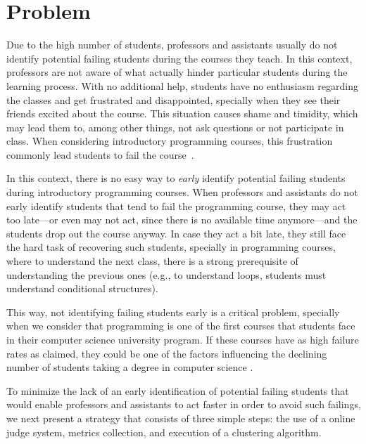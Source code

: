 \section{Problem}

\label{sec:problem}

Due to the high number of students, professors and assistants usually do not identify potential failing students during the courses they teach. In this context, professors are not aware of what actually hinder particular students during the learning process. With no additional help, students have no enthusiasm regarding the classes and get frustrated and disappointed, specially when they see their friends excited about the course. This situation causes shame and timidity, which may lead them to, among other things, not ask questions or not participate in class. When considering introductory programming courses, this frustration commonly lead students to fail the course~\cite{}.

In this context, there is no easy way to \textit{early} identify potential failing students during introductory programming courses. When professors and assistants do not early identify students that tend to fail the programming course, they may act too late---or even may not act, since there is no available time anymore---and the students drop out the course anyway. In case they act a bit late, they still face the hard task of recovering such students, specially in programming courses, where to understand the next class, there is a strong prerequisite of understanding the previous ones (e.g., to understand loops, students must understand conditional structures).

This way, not identifying failing students early is a critical problem, specially when we consider that programming is one of the first courses that students face in their computer science university program. If these courses have as high failure rates as claimed, they could be one of the factors influencing the declining number of students taking a degree in computer science \cite{bennedsen-sigcse}.

To minimize the lack of an early identification of potential failing students that would enable professors and assistants to act faster in order to avoid such failings, we next present a strategy that consists of three simple steps: the use of a online judge system, metrics collection, and execution of a clustering algorithm.